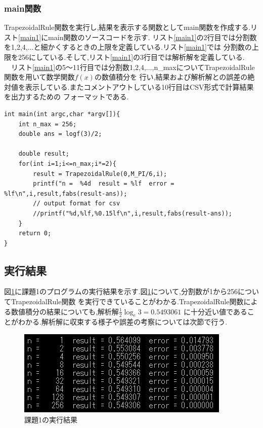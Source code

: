 \documentclass[dvipdfmx]{jarticle}
\begin{document}
    \subsubsection{main関数}
    TrapezoidalRule関数を実行し,結果を表示する関数としてmain関数を作成する.リスト\ref{main1}にmain関数のソースコードを示す.
    リスト\ref{main1}の2行目では分割数を1,2,4,$\dots$と細かくするときの上限を定義している.リスト\ref{main1}では
    分割数の上限を256にしている.そして,リスト\ref{main1}の3行目では解析解を定義している.\\
    　リスト\ref{main1}の5～11行目では分割数1,2,4,$\dots$,n\_maxについてTrapezoidalRule関数を用いて数学関数$f(x)$の数値積分を
    行い,結果および解析解との誤差の絶対値を表示している.またコメントアウトしている10行目はCSV形式で計算結果を出力するための
    フォーマットである.
      \begin{lstlisting}[basicstyle=\ttfamily\footnotesize, frame=single,label=main1,caption=main1関数]
int main(int argc,char *argv[]){
    int n_max = 256;
    double ans = logf(3)/2;

    double result;
    for(int i=1;i<=n_max;i*=2){
        result = TrapezoidalRule(0,M_PI/6,i);
        printf("n =  %4d  result = %lf  error = %lf\n",i,result,fabs(result-ans));
        // output format for csv
        //printf("%d,%lf,%0.15lf\n",i,result,fabs(result-ans));
    }
    return 0;
}
            \end{lstlisting}

    \subsection{実行結果}
    図\ref{result1}に課題1のプログラムの実行結果を示す.図\ref{result1}について,分割数が1から256についてTrapezoidalRule関数
    を実行できていることがわかる.TrapezoidalRule関数による数値積分の結果についても,解析解$\frac{1}{2} \log_{e} 3 = 0.5493061$
    に十分近い値であることがわかる.解析解に収束する様子や誤差の考察については次節で行う.

    \begin{figure}[H]
      \centering
      \includegraphics[scale=0.9]{kadai1.png}
      \caption{課題1の実行結果}
       \label{result1}
      \end{figure}
\end{document}
